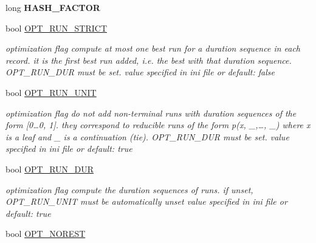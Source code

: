 \begin{DoxyCompactItemize}
\mbox{\label{group__general_ga38297772685de12449644c49b20213d3}} 
long {\bfseries H\+A\+S\+H\+\_\+\+F\+A\+C\+T\+OR}
\item 
\mbox{\label{group__general_gaf2f921cdceea999adbede3b238fbd924}} 
bool \mbox{\hyperlink{group__general_gaf2f921cdceea999adbede3b238fbd924}{O\+P\+T\+\_\+\+R\+U\+N\+\_\+\+S\+T\+R\+I\+CT}}
\begin{DoxyCompactList}\small\item\em optimization flag compute at most one best run for a duration sequence in each record. it is the first best run added, i.\+e. the best with that duration sequence. O\+P\+T\+\_\+\+R\+U\+N\+\_\+\+D\+UR must be set. value specified in ini file or default\+: false \end{DoxyCompactList}\item 
\mbox{\label{group__general_gaf43b37abf039bc3d2e67681387760de6}} 
bool \mbox{\hyperlink{group__general_gaf43b37abf039bc3d2e67681387760de6}{O\+P\+T\+\_\+\+R\+U\+N\+\_\+\+U\+N\+IT}}
\begin{DoxyCompactList}\small\item\em optimization flag do not add non-\/terminal runs with duration sequences of the form \mbox{[}0…0, 1\mbox{]}. they correspond to reducible runs of the form p(x, \+\_\+,…, \+\_\+) where x is a leaf and \+\_\+ is a continuation (tie). O\+P\+T\+\_\+\+R\+U\+N\+\_\+\+D\+UR must be set. value specified in ini file or default\+: true \end{DoxyCompactList}\item 
\mbox{\label{group__general_ga75258703c393347e8c7af15041e0e7d2}} 
bool \mbox{\hyperlink{group__general_ga75258703c393347e8c7af15041e0e7d2}{O\+P\+T\+\_\+\+R\+U\+N\+\_\+\+D\+UR}}
\begin{DoxyCompactList}\small\item\em optimization flag compute the duration sequences of runs. if unset, O\+P\+T\+\_\+\+R\+U\+N\+\_\+\+U\+N\+IT must be automatically unset value specified in ini file or default\+: true \end{DoxyCompactList}\item 
\mbox{\label{group__general_ga4445e6f07c267b6c601d33f1bf23ad2c}} 
bool \mbox{\hyperlink{group__general_ga4445e6f07c267b6c601d33f1bf23ad2c}{O\+P\+T\+\_\+\+N\+O\+R\+E\+ST}}

\end{DoxyCompactItemize}
